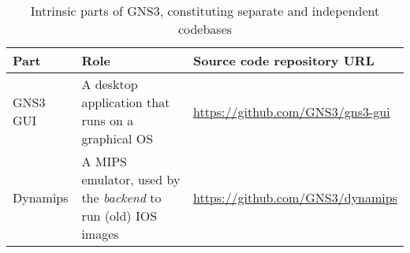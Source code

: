 \begin{table}
  \centering
  \small
  \begin{tabulary}{0.8\textwidth}{lLL}
    \toprule
      \textbf{Part}  & \textbf{Role}                                                       & \textbf{Source code repository URL}\\
    \midrule
      GNS3 GUI       & A desktop application that runs on a graphical OS                   & \scriptsize\url{https://github.com/GNS3/gns3-gui}\\
      Dynamips       & A MIPS emulator, used by the \emph{backend} to run (old) IOS images & \scriptsize\url{https://github.com/GNS3/dynamips}\\
    \bottomrule
  \end{tabulary}
  \caption{%
    Intrinsic parts of GNS3, constituting separate and independent codebases
  }
  \label{tab:gns3components}
\end{table}
